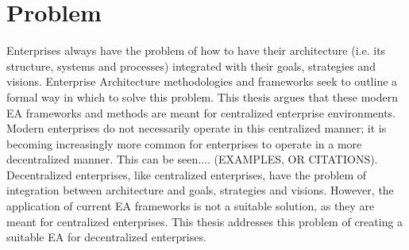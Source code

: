 \section{Problem}
Enterprises always have the problem of how to have their architecture (i.e. its structure, systems and processes) integrated with their goals, strategies and visions. Enterprise Architecture methodologies and frameworks seek to outline a formal way in which to solve this problem. This thesis argues that these modern EA frameworks and methods are meant for centralized enterprise environments. Modern enterprises do not necessarily operate in this centralized manner; it is becoming increasingly more common for enterprises to operate in a more decentralized manner. This can be seen.... (EXAMPLES, OR CITATIONS).  Decentralized enterprises, like centralized enterprises, have the problem of integration between architecture and goals, strategies and visions.  However, the application of current EA frameworks is not a suitable solution, as they are meant for centralized enterprises. This thesis addresses this problem of creating a suitable EA for decentralized enterprises.
